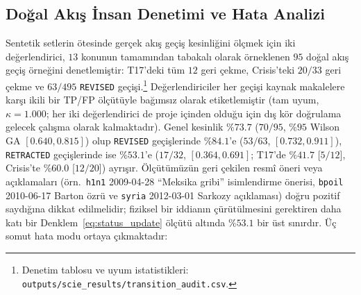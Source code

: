 ﻿\documentclass[journal]{IEEEtran}
\begin{document}
\subsection{Do\u{g}al Ak{\i}\c{s} \.{I}nsan Denetimi ve Hata Analizi}
\label{subsec:error_analysis}

Sentetik setlerin \"{o}tesinde ger\c{c}ek ak{\i}\c{s} ge\c{c}i\c{s} kesinli\u{g}ini \"{o}l\c{c}mek i\c{c}in iki de\u{g}erlendirici, $13$ konunun tamam{\i}ndan tabakal{\i} olarak \"{o}rneklenen $95$ do\u{g}al ak{\i}\c{s} ge\c{c}i\c{s} \"{o}rne\u{g}ini denetlemi\c{s}tir: T17'deki t\"{u}m $12$ geri \c{c}ekme, Crisis'teki $20/33$ geri \c{c}ekme ve $63/495$ \texttt{REVISED} ge\c{c}i\c{s}i.\footnote{Denetim tablosu ve uyum istatistikleri: \texttt{outputs/scie\_results/transition\_audit.csv}.} De\u{g}erlendiriciler her ge\c{c}i\c{s}i kaynak makalelere kar\c{s}{\i} ikili bir TP/FP \"{o}l\c{c}\"{u}t\"{u}yle ba\u{g}{\i}ms{\i}z olarak etiketlemi\c{s}tir (tam uyum, $\kappa = 1.000$; her iki de\u{g}erlendirici de proje i\c{c}inden oldu\u{g}u i\c{c}in d{\i}\c{s} k\"{o}r do\u{g}rulama gelecek \c{c}al{\i}\c{s}ma olarak kalmaktad{\i}r). Genel kesinlik $\%73.7$ ($70/95$, $\%95$ Wilson GA $[0.640, 0.815]$) olup \texttt{REVISED} ge\c{c}i\c{s}lerinde $\%84.1$'e ($53/63$, $[0.732, 0.911]$), \texttt{RETRACTED} ge\c{c}i\c{s}lerinde ise $\%53.1$'e ($17/32$, $[0.364, 0.691]$; T17'de $\%41.7$ [$5/12$], Crisis'te $\%60.0$ [$12/20$]) ayr{\i}\c{s}{\i}r. \"{O}l\c{c}\"{u}t\"{u}m\"{u}z\"{u}n geri \c{c}ekilen resm\^{i} \"{o}neri veya a\c{c}{\i}klamalar{\i} (\"{o}rn.\ \texttt{h1n1} 2009-04-28 ``Meksika gribi'' isimlendirme \"{o}nerisi, \texttt{bpoil} 2010-06-17 Barton \"{o}zr\"{u} ve \texttt{syria} 2012-03-01 Sarkozy a\c{c}{\i}klamas{\i}) do\u{g}ru pozitif sayd{\i}\u{g}{\i}na dikkat edilmelidir; fiziksel bir iddian{\i}n \c{c}\"{u}r\"{u}t\"{u}lmesini gerektiren daha kat{\i} bir Denklem~\eqref{eq:status_update} \"{o}l\c{c}\"{u}t\"{u} alt{\i}nda $\%53.1$ bir \"{u}st s{\i}n{\i}rd{\i}r. \"{U}\c{c} somut hata modu ortaya \c{c}{\i}kmaktad{\i}r:
\end{document}
